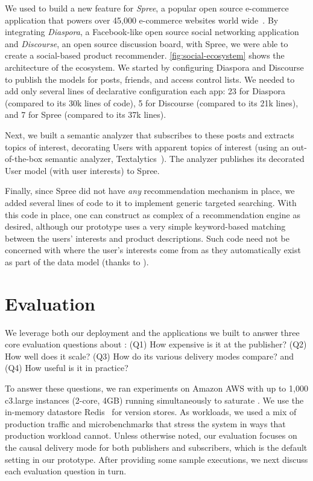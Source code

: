We used \synapse to build a new feature for \emph{Spree}, a popular open source
e-commerce application that powers over 45,000 e-commerce websites world wide~\cite{spree-site}.
By integrating \emph{Diaspora}, a Facebook-like open source social networking
application and \emph{Discourse}, an open source discussion board, with Spree, we
were able to create a social-based product recommender.
\F\ref{fig:social-ecosystem} shows the architecture of the ecosystem.
We started by configuring Diaspora and Discourse to publish the models
for posts, friends, and access control lists.
We needed to add only several lines of declarative configuration each app: 23
for Diaspora (compared to its 30k lines of code), 5 for Discourse (compared to
its 21k lines), and 7 for Spree (compared to its 37k lines).

Next, we built a semantic analyzer that subscribes to these posts and extracts topics of interest, decorating Users with apparent topics of interest (using an out-of-the-box semantic analyzer, Textalytics~\cite{textalytics}).
The analyzer publishes its decorated {\code User} model (with user interests) to Spree.

Finally, since Spree did not have \emph{any} recommendation mechanism in place, we added several lines of code to it to implement generic targeted searching.
With this code in place, one can construct as complex of a recommendation engine as
desired, although our prototype uses a very simple keyword-based matching
between the users' interests and product descriptions. Such code need not be
concerned with where the user's interests come from as they
automatically exist as part of the data model (thanks to \synapse).


\section{Evaluation}
\label{sec:evaluation}


We leverage both our deployment and the applications we built to answer three
core evaluation questions about \synapse: (Q1) How expensive is it
at the publisher? (Q2) How well does it scale? (Q3) How do its various
delivery modes compare? and (Q4) How useful is it in practice?

To answer these questions, we ran experiments on Amazon AWS with up to 1,000
c3.large instances (2-core, 4GB) running simultaneously to saturate \synapse.
We use the in-memory datastore Redis~\cite{redis} for version stores.
As workloads, we used a mix of \crowdtap production traffic and microbenchmarks
that stress the system in ways that production workload cannot.  Unless
otherwise noted, our evaluation focuses on the causal delivery mode for both publishers and subscribers, which is
the default setting in our prototype.  After providing some sample executions,
we next discuss each evaluation question in turn.


